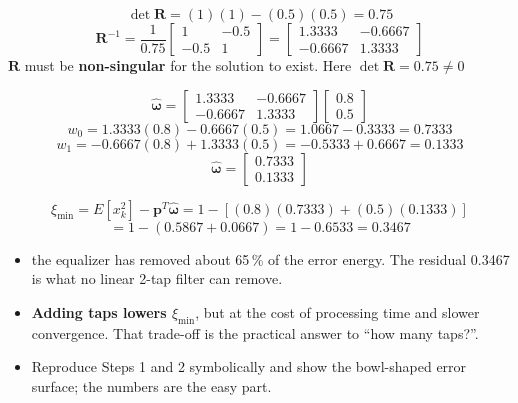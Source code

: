 \[ \det \mathbf{R} = (1)(1) - (0.5)(0.5) = 0.75 \]
\[ \mathbf{R}^{-1} = \frac{1}{0.75}\begin{bmatrix} 1 & -0.5 \\ -0.5 & 1 \end{bmatrix}
   = \begin{bmatrix} 1.3333 & -0.6667 \\ -0.6667 & 1.3333 \end{bmatrix} \]
{\color{sub}\footnotesize $\mathbf{R}$ must be \textbf{non-singular} for the solution to exist.
Here $\det\mathbf{R} = 0.75 \ne 0$ \checkmark}

\[ \hat{\boldsymbol{\omega}}
   = \begin{bmatrix} 1.3333 & -0.6667 \\ -0.6667 & 1.3333 \end{bmatrix}
     \begin{bmatrix} 0.8 \\ 0.5 \end{bmatrix} \]
\[ w_0 = 1.3333(0.8) - 0.6667(0.5) = 1.0667 - 0.3333 = 0.7333 \]
\[ w_1 = -0.6667(0.8) + 1.3333(0.5) = -0.5333 + 0.6667 = 0.1333 \]
\[ \boxed{\hat{\boldsymbol{\omega}} = \begin{bmatrix} 0.7333 \\ 0.1333 \end{bmatrix}} \]

\[ \xi_{\min} = E[x_k^2] - \mathbf{p}^T\hat{\boldsymbol{\omega}}
              = 1 - \left[(0.8)(0.7333) + (0.5)(0.1333)\right] \]
\[ = 1 - (0.5867 + 0.0667) = 1 - 0.6533 = \boxed{0.3467} \]

\begin{itemize}
  \item {} the equalizer has removed about 65\,\% of the error energy. The
        residual 0.3467 is what no linear 2-tap filter can remove.
  \item \textbf{Adding taps lowers $\xi_{\min}$}, but at the cost of processing time and slower
        convergence. That trade-off is the practical answer to ``how many taps?''.
  \item {} Reproduce Steps 1 and 2
        symbolically and show the bowl-shaped error surface; the numbers are the easy part.
\end{itemize}

\hr

{\color{sub}\footnotesize {}}

